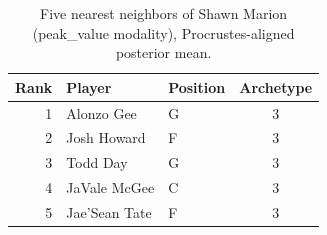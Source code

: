 \begin{table}[htbp]
  \centering\small
  \begin{tabular}{rllc}
    \toprule
    Rank & Player & Position & Archetype \\
    \midrule
    1 & Alonzo Gee & G & 3 \\
    2 & Josh Howard & F & 3 \\
    3 & Todd Day & G & 3 \\
    4 & JaVale McGee & C & 3 \\
    5 & Jae'Sean Tate & F & 3 \\
    \bottomrule
  \end{tabular}
  \caption{Five nearest neighbors of Shawn Marion (peak_value modality), Procrustes-aligned posterior mean.}
  \label{tab:Shawn_Marion_neighbors_peak_value}
\end{table}

